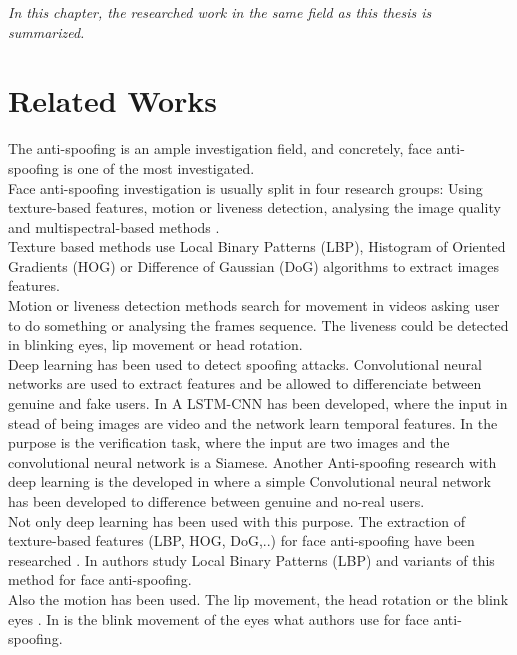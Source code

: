 \minitoc
\mtcskip

\begin{small}
\emph{In this chapter, the researched work in the same field as this thesis is summarized.}
\end{small} 

\section{Related Works}
The anti-spoofing is an ample investigation field, and concretely, face anti-spoofing is one of the most investigated.\\

Face anti-spoofing investigation is usually split in four research groups: Using texture-based features, motion or liveness detection, analysing the image quality and multispectral-based methods \cite{distorsion,LSTM-CNN}.\\

Texture based methods use Local Binary Patterns (LBP),  Histogram of Oriented Gradients (HOG) or Difference of Gaussian (DoG) algorithms to extract images features.\\

Motion or liveness detection methods search for movement in videos asking user to do something or analysing the frames sequence. The liveness could be detected in blinking eyes, lip movement or head rotation.\\



Deep learning has been used to detect spoofing attacks. Convolutional neural networks are used to extract features and be allowed to differenciate between genuine and fake users. In \cite{LSTM-CNN} A LSTM-CNN has been developed, where the input in stead of being images are video and the network learn temporal features. In \cite{Verification} the purpose is the verification task, where the input are two images and the convolutional neural network is a Siamese. Another Anti-spoofing research with deep learning is the developed in \cite{yangLL14} where a simple Convolutional neural network has been developed to difference between genuine and no-real users.\\

Not only deep learning has been used with this purpose. The extraction of texture-based features (LBP, HOG, DoG,..) for face anti-spoofing have been researched \cite{distorsion}. In \cite{LBP_FaceAnti} authors study Local Binary Patterns (LBP) and variants of this method for face anti-spoofing.\\

Also the motion has been used. The lip movement, the head rotation or the blink eyes \cite{distorsion}. In \cite{Blink_antispoofing} is the blink movement of the eyes what authors use for face anti-spoofing.\\